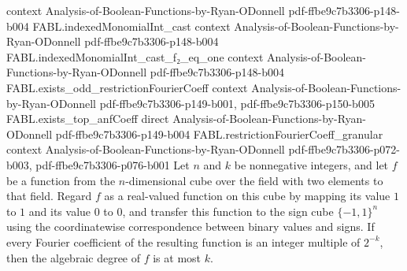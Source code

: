 \begin{theorem}
  {context}
  {Analysis-of-Boolean-Functions-by-Ryan-ODonnell}
  {pdf-ffbe9c7b3306-p148-b004}
\proofstep
  {FABL.indexedMonomialInt_cast}
  {context}
  {Analysis-of-Boolean-Functions-by-Ryan-ODonnell}
  {pdf-ffbe9c7b3306-p148-b004}
\proofstep
  {FABL.indexedMonomialInt_cast_f₂_eq_one}
  {context}
  {Analysis-of-Boolean-Functions-by-Ryan-ODonnell}
  {pdf-ffbe9c7b3306-p148-b004}
\proofstep
  {FABL.exists_odd_restrictionFourierCoeff}
  {context}
  {Analysis-of-Boolean-Functions-by-Ryan-ODonnell}
  {pdf-ffbe9c7b3306-p149-b001,
    pdf-ffbe9c7b3306-p150-b005}
\proofstep
  {FABL.exists_top_anfCoeff}
  {direct}
  {Analysis-of-Boolean-Functions-by-Ryan-ODonnell}
  {pdf-ffbe9c7b3306-p149-b004}
\proofstep
  {FABL.restrictionFourierCoeff_granular}
  {context}
  {Analysis-of-Boolean-Functions-by-Ryan-ODonnell}
  {pdf-ffbe9c7b3306-p072-b003,
    pdf-ffbe9c7b3306-p076-b001}
Let $n$ and $k$ be nonnegative integers, and let $f$ be a function from the
$n$-dimensional cube over the field with two elements to that field. Regard $f$ as a
real-valued function on this cube by mapping its value $1$ to $1$ and its value $0$ to
$0$, and transfer this function to the sign cube $\{-1,1\}^n$ using the coordinatewise
correspondence between binary values and signs. If every Fourier coefficient of the
resulting function is an integer multiple of $2^{-k}$, then the algebraic degree of $f$
is at most $k$.
\end{theorem}
